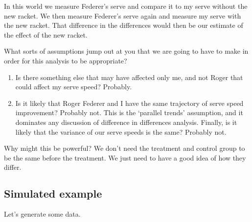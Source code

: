 \documentclass[
]{book}
\providecommand{\tightlist}{%
  \setlength{\itemsep}{0pt}\setlength{\parskip}{0pt}}
\begin{document}
In this world we measure Federer's serve and compare it to my serve without the new racket. We then measure Federer's serve again and measure my serve with the new racket. That difference in the differences would then be our estimate of the effect of the new racket.

What sorts of assumptions jump out at you that we are going to have to make in order for this analysis to be appropriate?

\begin{enumerate}
\def\labelenumi{\arabic{enumi})}
\tightlist
\item
  Is there something else that may have affected only me, and not Roger that could affect my serve speed? Probably.
\item
  Is it likely that Roger Federer and I have the same trajectory of serve speed improvement? Probably not. This is the `parallel trends' assumption, and it dominates any discussion of difference in differences analysis. Finally, is it likely that the variance of our serve speeds is the same? Probably not.
\end{enumerate}

Why might this be powerful? We don't need the treatment and control group to be the same before the treatment. We just need to have a good idea of how they differ.

\hypertarget{simulated-example}{%
\subsection{Simulated example}\label{simulated-example}}

Let's generate some data.
\end{document}
